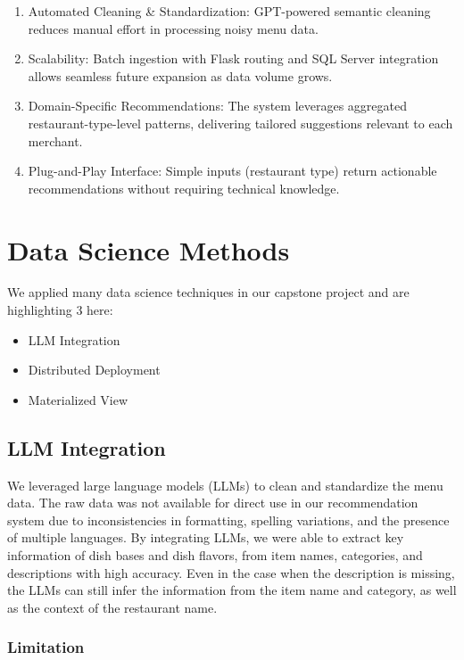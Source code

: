 \documentclass[
  11pt,
  a4paper,
  DIV=11,
  numbers=noendperiod]{scrartcl}
\providecommand{\tightlist}{%
  \setlength{\itemsep}{0pt}\setlength{\parskip}{0pt}}\usepackage{longtable,booktabs,array}
\begin{document}
\begin{enumerate}
\def\labelenumi{\arabic{enumi}.}
\tightlist
\item
  Automated Cleaning \& Standardization: GPT-powered semantic cleaning
  reduces manual effort in processing noisy menu data.
\item
  Scalability: Batch ingestion with Flask routing and SQL Server
  integration allows seamless future expansion as data volume grows.
\item
  Domain-Specific Recommendations: The system leverages aggregated
  restaurant-type-level patterns, delivering tailored suggestions
  relevant to each merchant.
\item
  Plug-and-Play Interface: Simple inputs (restaurant type) return
  actionable recommendations without requiring technical knowledge.
\end{enumerate}

\section{Data Science Methods}\label{data-science-methods}

We applied many data science techniques in our capstone project and are
highlighting 3 here:

\begin{itemize}
\tightlist
\item
  LLM Integration
\item
  Distributed Deployment
\item
  Materialized View
\end{itemize}

\subsection{LLM Integration}\label{llm-integration}

We leveraged large language models (LLMs) to clean and standardize the
menu data. The raw data was not available for direct use in our
recommendation system due to inconsistencies in formatting, spelling
variations, and the presence of multiple languages. By integrating LLMs,
we were able to extract key information of dish bases and dish flavors,
from item names, categories, and descriptions with high accuracy. Even
in the case when the description is missing, the LLMs can still infer
the information from the item name and category, as well as the context
of the restaurant name.

\subsubsection{Limitation}\label{limitation}
\end{document}
